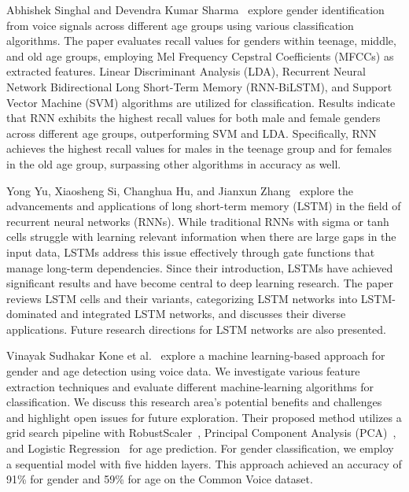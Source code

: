 \documentclass[conference, 10pt,onecolumn]{IEEEtran}
\begin{document}
Abhishek Singhal and Devendra Kumar Sharma~\cite{abdi2010principal} explore gender identification from voice signals across different age groups using various classification algorithms. The paper evaluates recall values for genders within teenage, middle, and old age groups, employing Mel Frequency Cepstral Coefficients (MFCCs) as extracted features. Linear Discriminant Analysis (LDA), Recurrent Neural Network Bidirectional Long Short-Term Memory (RNN-BiLSTM), and Support Vector Machine (SVM) algorithms are utilized for classification. Results indicate that RNN exhibits the highest recall values for both male and female genders across different age groups, outperforming SVM and LDA. Specifically, RNN achieves the highest recall values for males in the teenage group and for females in the old age group, surpassing other algorithms in accuracy as well.

Yong Yu, Xiaosheng Si, Changhua Hu, and Jianxun Zhang~\cite{yu2019review} explore the advancements and applications of long short-term memory (LSTM) in the field of recurrent neural networks (RNNs). While traditional RNNs with sigma or tanh cells struggle with learning relevant information when there are large gaps in the input data, LSTMs address this issue effectively through gate functions that manage long-term dependencies. Since their introduction, LSTMs have achieved significant results and have become central to deep learning research. The paper reviews LSTM cells and their variants, categorizing LSTM networks into LSTM-dominated and integrated LSTM networks, and discusses their diverse applications. Future research directions for LSTM networks are also presented.

Vinayak Sudhakar Kone et al.~\cite{kone2023voice} explore a machine learning-based approach for gender and age detection using voice data. We investigate various feature extraction techniques and evaluate different machine-learning algorithms for classification. We discuss this research area's potential benefits and challenges and highlight open issues for future exploration. Their proposed method utilizes a grid search pipeline with RobustScaler~\cite{qian2022robustscaler}, Principal Component Analysis (PCA)~\cite{abdi2010principal}, and Logistic Regression~\cite{lavalley2008logistic} for age prediction. For gender classification, we employ a sequential model with five hidden layers. This approach achieved an accuracy of 91\% for gender and 59\% for age on the Common Voice dataset.
\end{document}
